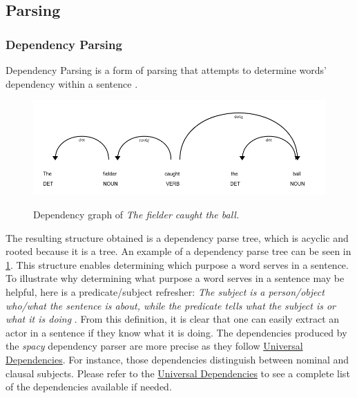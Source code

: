 
\subsection{Parsing}

\subsubsection{Dependency Parsing}
\label{dependency-parsing}

Dependency Parsing is a form of parsing that attempts to determine words' dependency within a sentence \cite{RefWorks:RefID:28-jurafsky2014speech}.

\begin{figure}[h]
\caption{Dependency graph of \emph{The fielder caught the ball.}}
\centering
\includegraphics[width=\textwidth]{background/dependency_graph.png}
\label{dependency-graph}
\end{figure}

The resulting structure obtained is a dependency parse tree, which is acyclic and rooted because it is a tree.
An example of a dependency parse tree can be seen in \ref{dependency-graph}.
This structure enables determining which purpose a word serves in a sentence.
To illustrate why determining what purpose a word serves in a sentence may be helpful, here is a predicate/subject refresher:
\emph{The subject is a person/object who/what the sentence is about, while the predicate tells what the subject is or what it is doing} \cite{RefWorks:RefID:27-subject}.
From this definition, it is clear that one can easily extract an actor in a sentence if they know what it is doing.
The dependencies produced by the \emph{spacy} dependency parser are more precise as they follow \hyperlink{https://univesaldependencies.org}{Universal Dependencies}.
For instance, those dependencies distinguish between nominal and clausal subjects.
Please refer to the \hyperlink{https://univesaldependencies.org}{Universal Dependencies} to see a complete list of the dependencies available if needed. 

